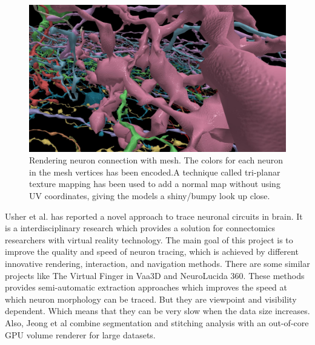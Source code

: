 \documentclass[10pt,twocolumn,letterpaper]{article}
\begin{document}
\begin{figure}[h]
\begin{center}
   \includegraphics[width=1.0\linewidth]{gen.png}
\end{center}
   \caption{Rendering neuron connection with mesh. The colors for each neuron in the mesh vertices has been encoded.A technique called tri-planar texture mapping has been used to add a normal map without using UV coordinates, giving the models a shiny/bumpy look up close.}
\label{fig:gen}
\end{figure}

Usher et al.\cite{Usher2018} has reported a novel approach to trace neuronal circuits in brain. It is a interdisciplinary research which provides a solution for connectomics researchers with virtual reality technology. The main goal of this project is to improve the quality and speed of neuron tracing, which is achieved by different innovative rendering, interaction, and navigation methods. There are some similar projects like The Virtual Finger in Vaa3D and NeuroLucida 360. These methods provides semi-automatic extraction approaches which improves the speed at which neuron morphology can be traced. But they are viewpoint and visibility dependent. Which means that they can be very slow when the data size increases. Also, Jeong et al \cite{Jeong2010} combine segmentation and stitching analysis with an out-of-core GPU volume renderer for large datasets.
\end{document}

